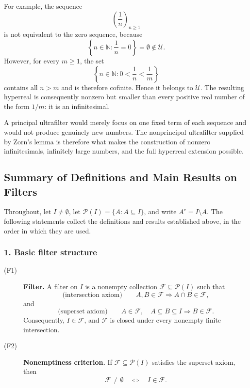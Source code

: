 {For example, the sequence
\[
\left(\frac{1}{n}\right)_{n\geq 1}
\]
is not equivalent to the zero sequence, because
\[
\left\{
n\in\mathbb{N}:
\frac{1}{n}=0
\right\}
=
\emptyset
\notin\mathcal{U}.
\]
However, for every \(m\geq 1\), the set
\[
\left\{
n\in\mathbb{N}:
0<\frac{1}{n}<\frac{1}{m}
\right\}
\]
contains all \(n>m\) and is therefore cofinite. Hence it belongs to
\(\mathcal{U}\). The resulting hyperreal is consequently nonzero but
smaller than every positive real number of the form \(1/m\): it is an
infinitesimal.

A principal ultrafilter would merely focus on one fixed term of each
sequence and would not produce genuinely new numbers. The nonprincipal
ultrafilter supplied by Zorn's lemma is therefore what makes the
construction of nonzero infinitesimals, infinitely large numbers, and the
full hyperreal extension possible.



\subsection{Summary of Definitions and Main Results on Filters}
\label{subsec:filters-summary}

Throughout, let \(I\neq\emptyset\), let
\(\mathcal{P}(I)=\{A:A\subseteq I\}\), and write
\(A^c=I\setminus A\). The following statements collect the definitions and
results established above, in the order in which they are used.

\subsubsection*{1. Basic filter structure}

\begin{description}
    \item[\textnormal{(F1)}] \textbf{Filter.}
    A filter on \(I\) is a nonempty collection
    \(\mathcal{F}\subseteq\mathcal{P}(I)\) such that
    \[\text{(intersection axiom)} \qquad
    A,B\in\mathcal{F}
    \Longrightarrow
    A\cap B\in\mathcal{F},
    \]
    and
    \[ \text{(superset axiom)} \qquad
    A\in\mathcal{F},\quad A\subseteq B\subseteq I
    \Longrightarrow
    B\in\mathcal{F}.
    \]
    Consequently, \(I\in\mathcal{F}\), and \(\mathcal{F}\) is closed under
    every nonempty finite intersection.

    \item[\textnormal{(F2)}] \textbf{Nonemptiness criterion.}
    If \(\mathcal{F}\subseteq\mathcal{P}(I)\) satisfies the superset axiom,
    then
    \[
    \mathcal{F}\neq\emptyset
    \quad\Longleftrightarrow\quad
    I\in\mathcal{F}.
    \]


\end{description}}
